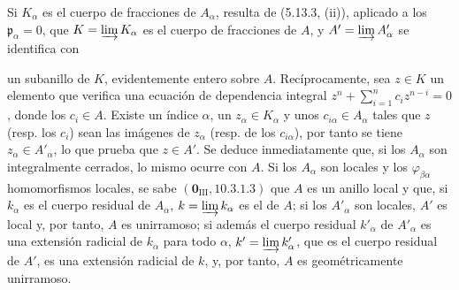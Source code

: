 Si $K_\alpha$ es el cuerpo de fracciones de $A_\alpha$, resulta de (5.13.3,
(ii)), aplicado a los $\mathfrak p_\alpha=0$, que
$K=\varinjlim K_\alpha$ es el cuerpo de fracciones de $A$, y
$A'=\varinjlim A'_\alpha$ se identifica con


un subanillo de $K$, evidentemente entero sobre $A$. Recíprocamente, sea
$z\in K$ un elemento que verifica una ecuación de dependencia integral
$z^n+\sum_{i=1}^{n}c_i z^{n-i}=0$,
donde los $c_i\in A$. Existe un índice $\alpha$, un
$z_\alpha\in K_\alpha$ y unos $c_{i\alpha}\in A_\alpha$ tales que $z$
(resp. los $c_i$) sean las imágenes de $z_\alpha$ (resp. de los
$c_{i\alpha}$), por tanto se tiene $z_\alpha\in A'_\alpha$, lo que prueba que
$z\in A'$. Se deduce inmediatamente que, si los $A_\alpha$ son integralmente
cerrados, lo mismo ocurre con $A$. Si los $A_\alpha$ son locales y los
$\varphi_{\beta\alpha}$ homomorfismos locales, se sabe
$(\mathbf{0}_{\mathrm{III}}, 10.3.1.3)$ que $A$ es un anillo local y que, si
$k_\alpha$ es el cuerpo residual de $A_\alpha$,
$k=\varinjlim k_\alpha$ es el de $A$; si los $A'_\alpha$ son locales, $A'$ es
local y, por tanto, $A$ es unirramoso; si además el cuerpo residual
$k'_\alpha$ de $A'_\alpha$ es una extensión radicial de $k_\alpha$ para todo
$\alpha$, $k'=\varinjlim k'_\alpha$, que es el cuerpo residual de $A'$, es
una extensión radicial de $k$, y, por tanto, $A$ es geométricamente
unirramoso.
